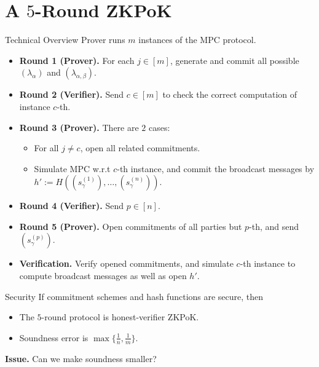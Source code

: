 \documentclass{beamer}
\begin{document}
	\section{A $5$-Round ZKPoK}
	\begin{frame}{Technical Overview} 
		Prover runs $m$ instances of the MPC protocol.\pause
		\begin{itemize}
			\item \textbf{Round 1 (Prover).} For each $j \in [m]$, generate and commit all possible $(\lambda_\alpha)$ and $(\lambda_{\alpha,\beta})$.\pause
			\item \textbf{Round 2 (Verifier).} Send $c \in [m]$ to check the correct computation of instance $c$-th.\pause
			\item \textbf{Round 3 (Prover).} There are $2$ cases:\pause
			\begin{itemize}
				\item For all $j \neq c$, open all related commitments.\pause
				\item Simulate MPC w.r.t $c$-th instance, and commit the broadcast messages by $h' := H\left((s_\gamma^{(1)}), \dots, (s_\gamma^{(n)})\right)$.\pause
			\end{itemize}
			\item \textbf{Round 4 (Verifier).} Send $p \in [n]$.\pause
			\item \textbf{Round 5 (Prover).} Open commitments of all parties but $p$-th, and send $(s_\gamma^{(p)})$.\pause
			\item \textbf{Verification.} Verify opened commitments, and simulate $c$-th instance to compute broadcast messages as well as open $h'$.
		\end{itemize}
	\end{frame}

	\begin{frame}{Security}
		If commitment schemes and hash functions are secure, then \pause
		\begin{itemize}
			\item The $5$-round protocol is honest-verifier ZKPoK.\pause
			\item Soundness error is $\max\{\frac{1}{n}, \frac{1}{m}\}$.\pause
		\end{itemize}
		\textbf{Issue.} Can we make soundness smaller?
	\end{frame}
\end{document}

